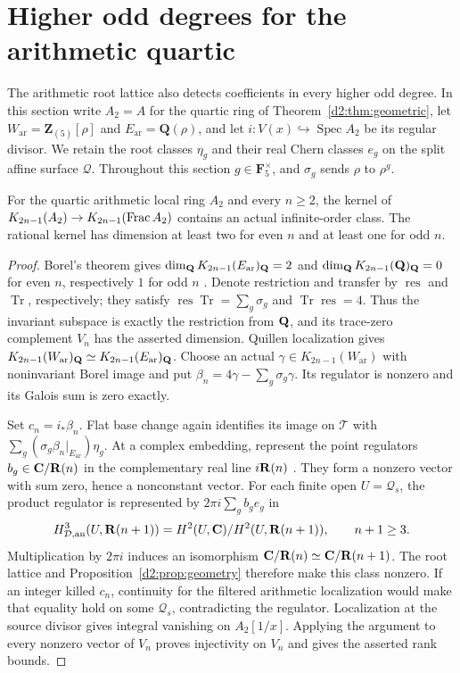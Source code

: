 \section{Higher odd degrees for the arithmetic quartic}
\label{d2ext:higher-odd-quartic}

The arithmetic root lattice also detects coefficients in every higher
odd degree. In this section write $A_2=A$ for the quartic ring of
Theorem~\ref{d2:thm:geometric}, let
$W_{\mathrm{ar}}=\mathbf Z_{(5)}[\rho]$ and
$E_{\mathrm{ar}}=\mathbf Q(\rho)$, and let
$i:V(x)\hookrightarrow\operatorname{Spec}A_2$ be its regular divisor.
We retain the root classes $\eta_g$ and their real Chern classes $e_g$
on the split affine surface $\mathcal Q$. Throughout this section
$g\in\mathbf F_5^\times$, and $\sigma_g$ sends $\rho$ to $\rho^g$.

\begin{theorem}
\label{d2ext:twodimalloddgeometric}
For the quartic arithmetic local ring $A_2$ and every $n\ge2$, the kernel of
$K_{2n-1}(A_2)\to K_{2n-1}(\operatorname{Frac} A_2)$ contains an actual infinite-order
class. The rational kernel has dimension at least two for even $n$
and at least one for odd $n$.
\end{theorem}
\begin{proof}
Borel's theorem gives $\dim_{\mathbf Q}K_{2n-1}(E_{\mathrm{ar}})_{\mathbf Q}=2$ and
$\dim_{\mathbf Q}K_{2n-1}(\mathbf Q)_{\mathbf Q}=0$ for even $n$, respectively $1$
for odd $n$ \cite[Proposition~12.2]{Borel}. Denote restriction and transfer by $\operatorname{res}$
and $\operatorname{Tr}$, respectively; they satisfy
$\operatorname{res}\operatorname{Tr}=\sum_g\sigma_g$ and
$\operatorname{Tr}\operatorname{res}=4$. Thus the invariant subspace
is exactly the restriction from $\mathbf Q$, and its trace-zero complement
$V_n$ has the asserted dimension. Quillen localization \cite{Quillen,Weibel} gives
$K_{2n-1}(W_{\mathrm{ar}})_{\mathbf Q}\simeq K_{2n-1}(E_{\mathrm{ar}})_{\mathbf Q}$.
Choose an actual $\gamma\in K_{2n-1}(W_{\mathrm{ar}})$ with noninvariant Borel
image and put $\beta_n=4\gamma-\sum_g\sigma_g\gamma$.
Its regulator is nonzero and its Galois sum is zero exactly.

Set $c_n=i_*\beta_n$. Flat base change again identifies its image
on $\mathcal T$ with $\sum_g(\sigma_g\beta_n|_{E_{\mathrm{ar}}})\eta_g$.
At a complex embedding, represent the point regulators
$b_g\in\mathbf C/\mathbf R(n)$ in the complementary real line $i\mathbf R(n)$
\cite[Section~6]{BunkeTamme}.
They form a nonzero vector with sum zero, hence a nonconstant vector.
For each finite open $U=\mathcal Q_s$, the product regulator is
represented by $2\pi i\sum_gb_ge_g$ in
\[
 H_{\mathcal D,\mathrm{an}}^3(U,\mathbf R(n+1))=H^2(U,\mathbf C)/H^2(U,\mathbf R(n+1)),
 \qquad n+1\ge3.
\]
Multiplication by $2\pi i$ induces an isomorphism
$\mathbf C/\mathbf R(n)\simeq\mathbf C/\mathbf R(n+1)$. The root lattice and
Proposition~\ref{d2:prop:geometry} therefore make this class
nonzero. If an integer killed $c_n$, continuity for the filtered
arithmetic localization would make that equality hold on some
$\mathcal Q_s$, contradicting the regulator. Localization at the
source divisor gives integral vanishing on $A_2[1/x]$.
Applying the argument to every nonzero vector of $V_n$ proves
injectivity on $V_n$ and gives the asserted rank bounds.
\end{proof}

